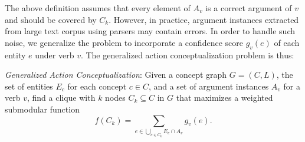 The above definition assumes that every element of $A_v$ is a correct argument
of $v$ and should be covered by $C_k$.
However, in practice, argument instances extracted from large text corpus
using parsers may contain errors. In order to handle such noise,
we generalize the problem to incorporate a confidence score $g_v(e)$
of each entity $e$ under verb $v$.
The generalized action conceptualization problem is thus:
\begin{definition}
\label{def:acw}
\emph{Generalized Action Conceptualization}: 
Given a concept graph $G=(C,L)$,
the set of entities $E_c$ for each concept $c\in C$,
and a set of argument instances $A_v$ for a verb $v$, find a clique
with $k$ nodes $C_k\subseteq C$
in $G$ that maximizes a weighted submodular function
\begin{equation}
f(C_k)=\sum_{e\in \bigcup_{c\in C_k}{E_c}\cap A_v}{g_v(e)}.
\label{eq:f}
\end{equation}
\end{definition}

